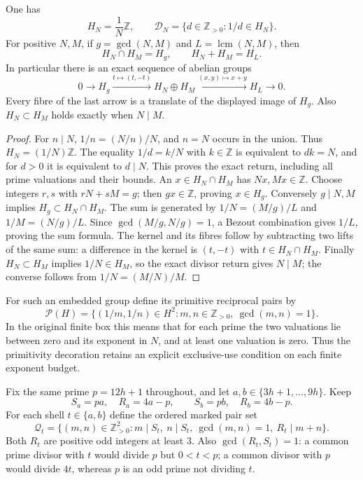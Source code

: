 \begin{proposition}
\label{prop:connes-finite-return}
One has
\[
 H_N=\frac1N\mathbb Z,\qquad
 \mathcal D_N=\{d\in\mathbb Z_{>0}:1/d\in H_N\}.
\]
For positive $N,M$, if $g=\gcd(N,M)$ and $L=\operatorname{lcm}(N,M)$,
then
\[
 H_N\cap H_M=H_g,\qquad H_N+H_M=H_L.
\]
In particular there is an exact sequence of abelian groups
\[
 0\longrightarrow H_g\xrightarrow{t\mapsto(t,-t)}H_N\oplus H_M
 \xrightarrow{(x,y)\mapsto x+y}H_L\longrightarrow0.
\]
Every fibre of the last arrow is a translate of the displayed image of
$H_g$.  Also $H_N\subset H_M$ holds exactly when $N\mid M$.
\end{proposition}
\begin{proof}
For $n\mid N$, $1/n=(N/n)/N$, and $n=N$ occurs in the union.
Thus $H_N=(1/N)\mathbb Z$.  The equality $1/d=k/N$ with $k\in\mathbb Z$
is equivalent to $dk=N$, and for $d>0$ it is equivalent to $d\mid N$.
This proves the exact return, including all prime valuations and their bounds.
An $x\in H_N\cap H_M$ has $Nx,Mx\in\mathbb Z$.
Choose integers $r,s$ with $rN+sM=g$; then $gx\in\mathbb Z$, proving
$x\in H_g$.  Conversely $g\mid N,M$ implies $H_g\subset H_N\cap H_M$.
The sum is generated by $1/N=(M/g)/L$ and $1/M=(N/g)/L$.
Since $\gcd(M/g,N/g)=1$, a Bezout combination gives $1/L$, proving the
sum formula.  The kernel and its fibres follow by subtracting two lifts
of the same sum: a difference in the kernel is $(t,-t)$ with
$t\in H_N\cap H_M$.  Finally $H_N\subset H_M$ implies $1/N\in H_M$,
so the exact divisor return gives $N\mid M$; the converse follows from
$1/N=(M/N)/M$.
\end{proof}


For such an embedded group define its primitive reciprocal pairs by
\[
 \mathcal P(H)=\{(1/m,1/n)\in H^2:
                  m,n\in\mathbb Z_{>0},\ \gcd(m,n)=1\}.
\]
In the original finite box this means that for each prime the two
valuations lie between zero and its exponent in $N$, and at least one
valuation is zero.  Thus the primitivity decoration retains an explicit
exclusive-use condition on each finite exponent budget.

Fix the same prime $p=12h+1$ throughout, and let
$a,b\in\{3h+1,\ldots,9h\}$.  Keep
\[
 S_a=pa,\quad R_a=4a-p,\qquad S_b=pb,\quad R_b=4b-p.
\]
For each shell $t\in\{a,b\}$ define the ordered marked pair set
\[
 \mathcal Q_t=\{(m,n)\in\mathbb Z_{>0}^2:
 m\mid S_t,\ n\mid S_t,\ \gcd(m,n)=1,\ R_t\mid m+n\}.
\]
Both $R_t$ are positive odd integers at least $3$.
Also $\gcd(R_t,S_t)=1$: a common prime divisor with $t$ would divide
$p$ but $0<t<p$; a common divisor with $p$ would divide $4t$, whereas
$p$ is an odd prime not dividing $t$.


